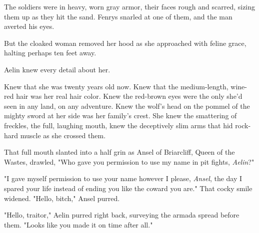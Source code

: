 The soldiers were in heavy, worn gray armor, their faces rough and scarred, sizing them up as they hit the sand.
Fenrys snarled at one of them, and the man averted his eyes.

But the cloaked woman removed her hood as she approached with feline grace, halting perhaps ten feet away.

Aelin knew every detail about her.

Knew that she was twenty years old now.
Knew that the medium-length, wine-red hair was her real hair color.
Knew the red-brown eyes were the only she'd seen in any land, on any adventure.
Knew the wolf's head on the pommel of the mighty sword at her side was her family's crest.
She knew the smattering of freckles, the full, laughing mouth, knew the deceptively slim arms that hid rock-hard muscle as she crossed them.

That full mouth slanted into a half grin as Ansel of Briarcliff, Queen of the Wastes, drawled, "Who gave you permission to use my name in pit fights, \emph{Aelin}?"

"I gave myself permission to use your name however I please,
\emph{Ansel}, the day I spared your life instead of ending you like the coward you are."
That cocky smile widened.
"Hello, bitch," Ansel purred.

"Hello, traitor," Aelin purred right back, surveying the armada spread before them.
"Looks like you made it on time after all."
